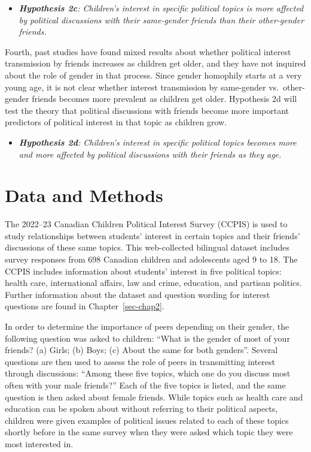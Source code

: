 \documentclass[
  letterpaper,
  DIV=11,
  numbers=noendperiod]{scrreprt}
\providecommand{\tightlist}{%
  \setlength{\itemsep}{0pt}\setlength{\parskip}{0pt}}\usepackage{longtable,booktabs,array}
\begin{document}
\begin{itemize}
\tightlist
\item
  \emph{\textbf{Hypothesis 2c}: Children's interest in specific
  political topics is more affected by political discussions with their
  same-gender friends than their other-gender friends.}
\end{itemize}

Fourth, past studies have found mixed results about whether political
interest transmission by friends increases as children get older, and
they have not inquired about the role of gender in that process. Since
gender homophily starts at a very young age, it is not clear whether
interest transmission by same-gender vs.~other-gender friends becomes
more prevalent as children get older. Hypothesis 2d will test the theory
that political discussions with friends become more important predictors
of political interest in that topic as children grow.

\begin{itemize}
\tightlist
\item
  \emph{\textbf{Hypothesis 2d}: Children's interest in specific
  political topics becomes more and more affected by political
  discussions with their friends as they age.}
\end{itemize}

\section{Data and Methods}\label{data-and-methods-2}

The 2022--23 Canadian Children Political Interest Survey (CCPIS) is used
to study relationships between students' interest in certain topics and
their friends' discussions of these same topics. This web-collected
bilingual dataset includes survey responses from 698 Canadian children
and adolescents aged 9 to 18. The CCPIS includes information about
students' interest in five political topics: health care, international
affairs, law and crime, education, and partisan politics. Further
information about the dataset and question wording for interest
questions are found in Chapter~\ref{sec-chap2}.

In order to determine the importance of peers depending on their gender,
the following question was asked to children: ``What is the gender of
most of your friends? (a) Girls; (b) Boys; (c) About the same for both
genders''. Several questions are then used to assess the role of peers
in transmitting interest through discussions: ``Among these five topics,
which one do you discuss most often with your male friends?'' Each of
the five topics is listed, and the same question is then asked about
female friends. While topics such as health care and education can be
spoken about without referring to their political aspects, children were
given examples of political issues related to each of these topics
shortly before in the same survey when they were asked which topic they
were most interested in.
\end{document}
